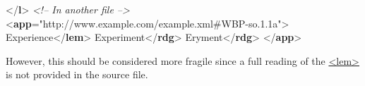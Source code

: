 \begin{shaded}
{</\textbf{l}>}\mbox{}\newline 
\textit{<!-- In another file -->}\mbox{}\newline 
{<\textbf{app}\hspace*{1em}{from}="{http://www.example.com/example.xml\#WBP-so.1.1a}">}\mbox{}\newline 
{}Experience{</\textbf{lem}>}\mbox{}\newline 
{}Experiment{</\textbf{rdg}>}\mbox{}\newline 
{}Eryment{</\textbf{rdg}>}\mbox{}\newline 
{</\textbf{app}>}\end{shaded}\egroup\par \noindent  However, this should be considered more fragile since a full reading of the \hyperref[TEI.lem]{<lem>} is not provided in the source file.\par
